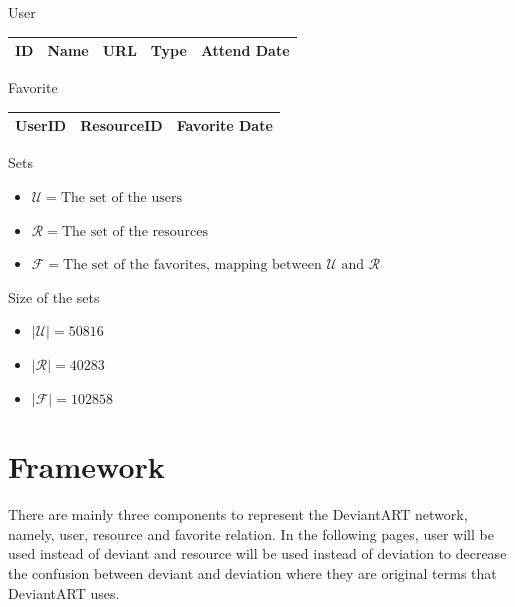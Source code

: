 \documentclass[12pt,a4paper]{report}
\begin{document}
	\begin{table}[htdp]
	\begin{center}
	\textup{\Large User} 
	\begin{tabular}{|p{2cm}|p{2cm}|p{2cm}|p{2cm}|p{4cm}|}
	\hline
	ID & Name & URL & Type & Attend Date \\
	\hline
	\end{tabular}
	\end{center}
	\end{table}

	\begin{table}[htdp]
	\begin{center}
	\textup{\Large Favorite} 
	\begin{tabular}{|p{4.25cm}|p{4.25cm}|p{4.25cm}|}
	\hline
	UserID & ResourceID & Favorite Date \\
	\hline
	\end{tabular}
	\end{center}
	\end{table}

	\large{Sets}

	\begin{itemize}
	\item $\mathcal{U} = \text{The set of the users}$
	\item $\mathcal{R} = \text{The set of the resources}$
	\item $\mathcal{F} = \text{The set of the favorites, mapping between } \mathcal{U} \text{ and } \mathcal{R}$

	\end{itemize}

	\large{Size of the sets}

	\begin{itemize}
	\item $|\mathcal{U}| = 50816$
	\item $|\mathcal{R}| = 40283$
	\item $|\mathcal{F}| = 102858$
	\end{itemize}

	\normalsize


\chapter{Framework} 

	\hspace{0.6cm}There are mainly three components to represent the DeviantART network, namely, user, resource and favorite relation. In the following pages, user will be used instead of  deviant and resource will be used instead of deviation to decrease the confusion between deviant and deviation where they are original terms that DeviantART uses.
\end{document}
